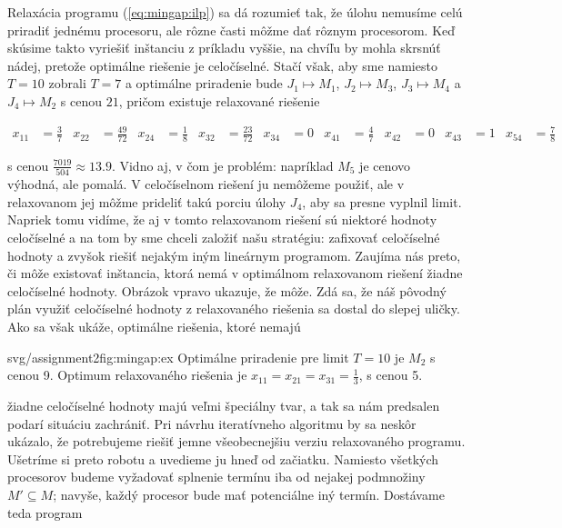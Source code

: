 \noindent
Relaxácia programu (\ref{eq:mingap:ilp}) sa dá rozumieť tak, že úlohu nemusíme celú priradiť jednému procesoru,
ale rôzne časti môžme dať rôznym procesorom.
Keď  skúsime takto vyriešiť inštanciu z príkladu vyššie, na chvíľu by mohla skrsnúť nádej,
pretože optimálne riešenie je celočíselné. Stačí však, aby sme namiesto $T=10$ zobrali $T=7$ a optimálne 
priradenie bude $J_1\mapsto M_1$, $J_2\mapsto M_3$, $J_3\mapsto M_4$ a $J_4\mapsto M_2$ s cenou $21$,
pričom existuje relaxované riešenie

\begin{align*}
  x_{11} &=\frac{3}{7} &
  x_{22} &=\frac{49}{72} &
  x_{24} &=\frac{1}{8} & 
  x_{32} &=\frac{23}{72} &
  x_{34} &=0 &
  x_{41} &=\frac{4}{7} &
  x_{42} &=0 &
  x_{43} &=1 &
  x_{54} &=\frac{7}{8}
\end{align*}

\noindent
\begin{minipage}[t]{0.5\textwidth}
  \vskip 0pt
\noindent
s cenou $\frac{7019}{504}\approx 13.9$. Vidno aj, v čom je problém: napríklad $M_5$ je cenovo výhodná, ale
pomalá. V celočíselnom riešení ju nemôžeme použiť, ale v relaxovanom jej môžme prideliť takú porciu úlohy $J_4$,
aby sa presne vyplnil limit. Napriek tomu vidíme, že aj v tomto relaxovanom riešení sú niektoré hodnoty celočíselné
a na tom by sme chceli založiť našu stratégiu: zafixovať celočíselné hodnoty a zvyšok riešiť nejakým 
iným lineárnym programom. Zaujíma nás preto, či môže existovať inštancia, ktorá nemá v optimálnom relaxovanom
riešení žiadne celočíselné hodnoty.
Obrázok vpravo ukazuje, že môže. Zdá sa, že náš pôvodný plán využiť celočíselné hodnoty z relaxovaného riešenia
sa dostal do slepej uličky. Ako sa však ukáže, optimálne riešenia, ktoré nemajú 
\end{minipage}\begin{minipage}[t]{0.5\textwidth}
  \begin{myfiglabel}{0.7\textwidth}{svg/assignment2}{fig:mingap:ex}
    Optimálne priradenie pre limit $T=10$ je $M_2$ s cenou 9. 
    Optimum relaxovaného riešenia je $x_{11}=x_{21}=x_{31}=\frac{1}{3}$,
  s cenou 5.
  \end{myfiglabel}
\end{minipage}
\noindent
žiadne celočíselné hodnoty majú veľmi špeciálny tvar, a tak sa nám predsalen podarí situáciu zachrániť.
Pri návrhu iteratívneho algoritmu by sa neskôr ukázalo, že potrebujeme riešiť jemne všeobecnejšiu verziu 
relaxovaného programu. Ušetríme si preto robotu a uvedieme ju hneď od začiatku. Namiesto všetkých procesorov
budeme vyžadovať splnenie termínu iba od nejakej podmnožiny $M'\subseteq M$; navyše, každý procesor bude mať 
potenciálne iný termín. Dostávame teda program

